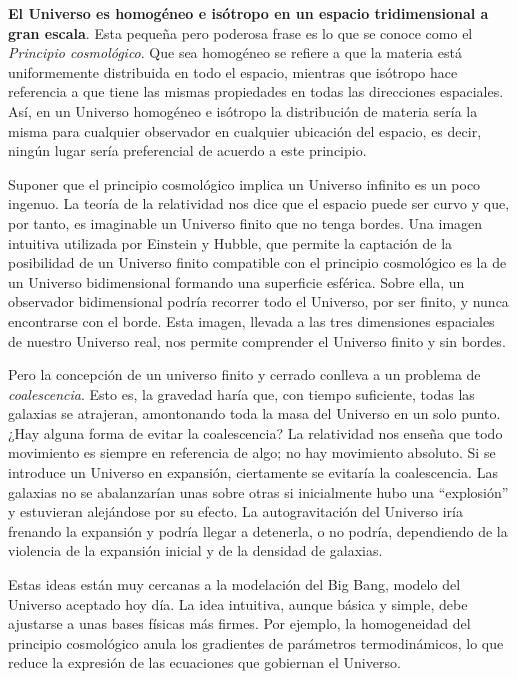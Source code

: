 \documentclass[a4paper,openright,12pt]{book}
\begin{document}
\textbf{El Universo es homogéneo e isótropo en un espacio tridimensional a gran escala}. Esta pequeña pero poderosa frase es lo que se conoce como el \textit{Principio cosmológico}. Que sea homogéneo se refiere a que la materia está uniformemente distribuida en todo el espacio, mientras que isótropo hace referencia a que tiene las mismas propiedades en todas las direcciones espaciales. Así, en un Universo homogéneo e isótropo la distribución de materia sería la misma para cualquier observador en cualquier ubicación del espacio, es decir, ningún lugar sería preferencial de acuerdo a este principio.

Suponer que el principio cosmológico implica un Universo infinito es un poco ingenuo. La teoría de la relatividad nos dice que el espacio puede ser curvo y que, por tanto, es imaginable un Universo finito que no tenga bordes. Una imagen intuitiva utilizada por Einstein y Hubble, que permite la captación de la posibilidad de un Universo finito compatible con el principio cosmológico es la de un Universo bidimensional formando una superficie esférica. Sobre ella, un observador bidimensional podría recorrer todo el Universo, por ser finito, y nunca encontrarse con el borde. Esta imagen, llevada a las tres dimensiones espaciales de nuestro Universo real, nos permite comprender el Universo finito y sin bordes.

Pero la concepción de un universo finito y cerrado conlleva a un problema de \textit{coalescencia}. Esto es, la gravedad haría que, con tiempo suficiente, todas las galaxias se atrajeran, amontonando toda la masa del Universo en un solo punto. ¿Hay alguna forma de evitar la coalescencia? La relatividad nos enseña que todo movimiento es siempre en referencia de algo; no hay movimiento absoluto. Si se introduce un Universo en expansión, ciertamente se evitaría la coalescencia. Las galaxias no se abalanzarían unas sobre otras si inicialmente hubo una ``explosión'' y estuvieran alejándose por su efecto. La autogravitación del Universo iría frenando la expansión y podría llegar a detenerla, o no podría, dependiendo de la violencia de la expansión inicial y de la densidad de galaxias.

Estas ideas están muy cercanas a la modelación del Big Bang, modelo del Universo aceptado hoy día. La idea intuitiva, aunque básica y simple, debe ajustarse a unas bases físicas más firmes. Por ejemplo, la homogeneidad del principio cosmológico anula los gradientes de parámetros termodinámicos, lo que reduce la expresión de las ecuaciones que gobiernan el Universo.
\end{document}
